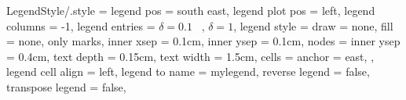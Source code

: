 
\pgfplotsset
{
	LegendStyle/.style =
	{
		legend pos				= south east, %
		legend plot pos			= left, %
		legend columns			= -1, %
		legend entries			= {$\delta = 0.1 \;\;\;$, $\delta = 1$},
		legend style			=
		{
			draw				= none,
			fill				= none,
			only marks,
			inner xsep			= 0.1cm,
			inner ysep			= 0.1cm,
			nodes				= {inner ysep = 0.4cm, text depth = 0.15cm, text width = 1.5cm},
			cells				= {anchor = east},
		},
		legend cell align		= left, %
		legend to name			= mylegend,
		reverse legend			= false, %
		transpose legend		= false, %
	}
}
